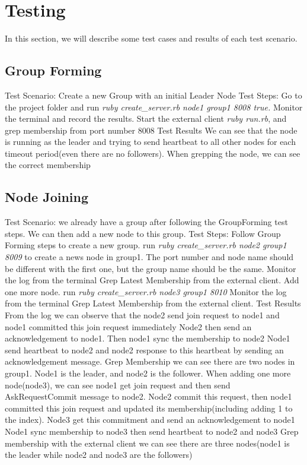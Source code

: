 \documentclass[a4paper,11pt]{article}
\begin{document}
\section{Testing}
In this section, we will describe some test cases and results of each test scenario. 
\subsection{Group Forming}
\begin{outline}
\1 Test Scenario: Create a new Group with an initial Leader Node
\1 Test Steps: 
  \2 Go to the project folder and run \emph{ruby create\_server.rb node1 group1 8008 true.}
  \2 Monitor the terminal and record the results. 
  \2 Start the external client \emph{ruby run.rb}, and grep membership from port number 8008
\1 Test Results
 \2 We can see that the node is running as the leader and trying to send heartbeat to all other nodes for each timeout period(even there are no followers).
 \2 When grepping the node, we can see the correct membership
\end{outline}

\subsection{Node Joining}
\begin{outline}
\1 Test Scenario: we already have a group after following the GroupForming test steps. We can then add a new node to this group.
\1 Test Steps:
  \2 Follow Group Forming steps to create a new group.
  \2 run \emph{ruby create\_server.rb node2 group1 8009} to create a news node in group1. The port number and node name should be different with the first one, but the group name should be the same.
  \2 Monitor the log from the terminal
  \2 Grep Latest Membership from the external client.
  \2 Add one more node. run \emph{ruby create\_server.rb node3 group1 8010}
  \2 Monitor the log from the terminal
  \2 Grep Latest Membership from the external client.
\1 Test Results
  \2 From the log we can observe that the node2 send join request to node1 and node1 committed this join request immediately
  \2 Node2 then send an acknowledgement to node1. Then node1 sync the membership to node2
  \2 Node1 send heartbeat to node2 and node2 response to this heartbeat by sending an acknowledgement message.
  \2 Grep Membership we can see there are two nodes in group1. Node1 is the leader, and node2 is the follower.
  \2 When adding one more node(node3), we can see node1 get join request and then send AskRequestCommit message to node2.
  \2 Node2 commit this request, then node1 committed this join request and updated its membership(including adding 1 to the index). Node3 get this commitment and send an acknowledgement to node1
  \2 Node1 sync membership to node3 then send heartbeat to node2 and node3
  \2 Grep membership with the external client we can see there are three nodes(node1 is the leader while node2 and node3 are the followers)
\end{outline}
\end{document}
